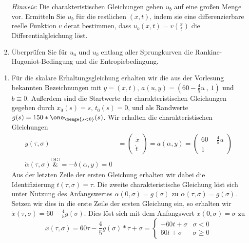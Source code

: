 \begin{exercisePage}
\begin{task}
\begin{enumerate}
		\emph{Hinweis}: Die charakteristischen Gleichungen geben $u_b$ auf eine großen Menge vor. Ermitteln Sie $u_b$ für die restlichen $(x,t)$, indem sie eine differenzierbare reelle Funktion $v$ derat bestimmen, dass $u_b(x,t) = v(\frac{x}{t})$ die Differentialgleichung löst.
		
		\item Überprüfen Sie für $u_a$ und $u_b$ entlang aller Sprungkurven die Rankine-Hugoniot-Bedingung und die Entropiebedingung.
	\end{enumerate}
\end{task}

\begin{enumerate}[label=(zu \alph*)]
	\item Für die skalare Erhaltungsgleichung erhalten wir die aus der Vorlesung bekannten Bezeichnungen mit $y = (x,t)$, $a(u,y) = (60 - \frac{4}{5} u \ , \ 1)$ und $b \equiv 0$. Außerdem sind die Startwerte der charakteristischen Gleichungen gegeben durch $x_0(s) = s$, $t_0(s) = 0$, und als Randwerte $g(s) = 150 * \one_{\menge{s < 0}}(s)$. Wir erhalten die charakteristischen Gleichungen
	\begin{equation*}
		\begin{aligned}
			\dot{y}(\tau, \sigma) &= \begin{pmatrix} \dot{x} \\ \dot{t} \end{pmatrix} = a(\alpha, y) = \begin{pmatrix} 60 - \frac{4}{5} u \\ 1 \end{pmatrix} \\
			\dot{\alpha}(\tau, \sigma) \overset{\text{DGl}}&{=} - b(\alpha, y) = 0  
		\end{aligned}
	\end{equation*}
	Aus der letzten Zeile der ersten Gleichung erhalten wir dabei die Identifizierung $t(\tau, \sigma) = \tau$. Die zweite charakteristische Gleichung löst sich unter Nutzung des Anfangswertes $\alpha(0,\sigma) = g(\sigma)$ zu $\alpha(\tau, \sigma) = g(\sigma)$. Setzen wir dies in die erste Zeile der ersten Gleichung ein, so erhalten wir $\dot{x}(\tau, \sigma) = 60 - \frac{4}{5} g(\sigma)$. Dies löst sich mit dem Anfangswert $x(0,\sigma) = \sigma$ zu 
	\begin{equation*}
		x(\tau, \sigma) = 60\tau - \frac{4}{5} g(\sigma) * \tau + \sigma = 
		\begin{cases}
			-60 t + \sigma & \sigma < 0 \\
			 60 t + \sigma & \sigma \ge 0

\end{cases}
\end{equation*}
\end{enumerate}
\end{exercisePage}
